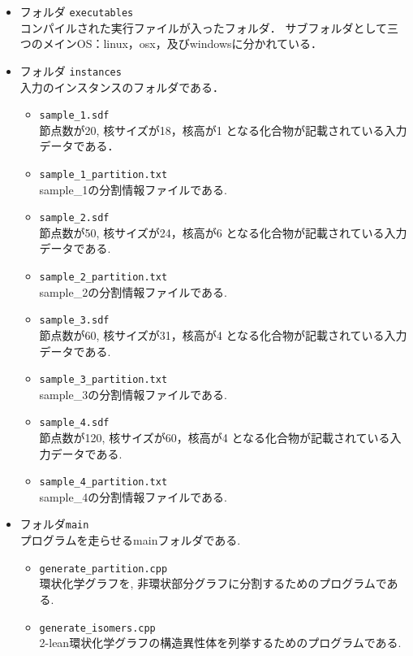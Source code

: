 \documentclass[11pt,titlepage,dvipdfmx,twoside]{jsbook}
\begin{document}
{\begin{itemize}
\begin{itemize}
    \item フォルダ {\tt executables}\\
      コンパイルされた実行ファイルが入ったフォルダ．
      サブフォルダとして三つのメインOS：linux，osx，及びwindowsに分かれている．
 
\item フォルダ {\tt instances}\\
	入力のインスタンスのフォルダである．
	\begin{itemize}
		\item{\tt sample\_1.sdf}\\
			節点数が20, 核サイズが18，核高が1
			となる化合物が記載されている入力データである．
		\item{\tt sample\_1\_partition.txt}\\
			sample\_1の分割情報ファイルである.
			\item{\tt sample\_2.sdf}\\
			節点数が50, 核サイズが24，核高が6
			となる化合物が記載されている入力データである.
		\item{\tt sample\_2\_partition.txt}\\
		sample\_2の分割情報ファイルである.
		\item{\tt sample\_3.sdf}\\
		節点数が60, 核サイズが31，核高が4
		となる化合物が記載されている入力データである.
		\item{\tt sample\_3\_partition.txt}\\
		sample\_3の分割情報ファイルである.
		\item{\tt sample\_4.sdf}\\
		節点数が120, 核サイズが60，核高が4
		となる化合物が記載されている入力データである.
		\item{\tt sample\_4\_partition.txt}\\
		sample\_4の分割情報ファイルである.
      \end{itemize}
\item フォルダ{\tt main}\\
	プログラムを走らせるmainフォルダである.
	\begin{itemize}
		\item{\tt generate\_partition.cpp}\\
			環状化学グラフを, 非環状部分グラフに分割するためのプログラムである.
		\item{\tt generate\_isomers.cpp}\\
			2-lean環状化学グラフの構造異性体を列挙するためのプログラムである.
	\end{itemize}
	

\end{itemize}
\end{itemize}}
\end{document}
